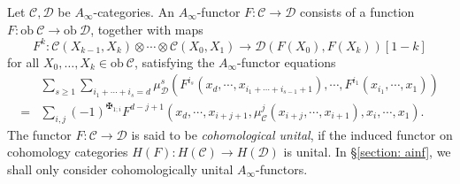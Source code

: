 \documentclass[11pt]{amsproc}
\def\cc{\mathcal{C}}
\def\dd{\mathcal{D}}
\def\ainf{A_\infty}
\def\ob{\mathrm{ob\ }}
\theoremstyle{remark}
\numberwithin{equation}{section}
\begin{document}
Let $\cc, \dd$ be $\ainf$-categories. 
An $\ainf$-functor $F: \cc \to \dd$ consists of a function $F: \ob \cc \to \ob \dd$,
together with maps
\begin{equation}
F^{k}: \cc(X_{k-1}, X_{k}) \otimes \cdots \otimes \cc(X_{0}, X_{1}) \to \dd(F(X_{0}), F(X_{k}))[1-k]
\end{equation} 
for all $X_{0}, \ldots, X_{k} \in \ob \cc$,
satisfying the $\ainf$-functor equations
\begin{equation}
\begin{split}
& \sum_{s \ge 1} \sum_{i_{1} + \cdots + i_{s} = d} \mu_{\dd}^{s}(F^{i_{s}}(x_{d}, \cdots, x_{i_{1} + \cdots + i_{s-1} + 1}), \cdots, F^{i_{1}}(x_{i_{1}}, \cdots, x_{1})) \\
= & \sum_{i, j} (-1)^{\maltese_{1;i}} F^{d - j + 1}(x_{d}, \cdots, x_{i + j + 1}, \mu_{\cc}^{j}(x_{i + j}, \cdots, x_{i+1}), x_{i}, \cdots, x_{1}).
\end{split}
\end{equation}
The functor $F: \cc \to \dd$ is said to be {\it cohomological unital}, 
if the induced functor on cohomology categories $H(F): H(\cc) \to H(\dd)$ is unital.
In \S\ref{section: ainf}, we shall only consider cohomologically unital $\ainf$-functors.
\end{document}

